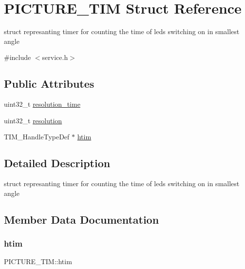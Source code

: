 \hypertarget{struct_p_i_c_t_u_r_e___t_i_m}{}\section{P\+I\+C\+T\+U\+R\+E\+\_\+\+T\+IM Struct Reference}
\label{struct_p_i_c_t_u_r_e___t_i_m}


struct represanting timer for counting the time of leds switching on in smallest angle  




{\ttfamily \#include $<$service.\+h$>$}

\subsection*{Public Attributes}
\begin{DoxyCompactItemize}
\item 
uint32\+\_\+t \mbox{\hyperlink{struct_p_i_c_t_u_r_e___t_i_m_ae44652306b65f37915c24a4c344733b5}{resolution\+\_\+time}}
\item 
uint32\+\_\+t \mbox{\hyperlink{struct_p_i_c_t_u_r_e___t_i_m_a3d06b455814460a24c468ebcd99d3816}{resolution}}
\item 
T\+I\+M\+\_\+\+Handle\+Type\+Def $\ast$ \mbox{\hyperlink{struct_p_i_c_t_u_r_e___t_i_m_ae83c4bfd7070876e22da472393b7a7a8}{htim}}
\end{DoxyCompactItemize}


\subsection{Detailed Description}
struct represanting timer for counting the time of leds switching on in smallest angle 

\subsection{Member Data Documentation}
\mbox{\label{struct_p_i_c_t_u_r_e___t_i_m_ae83c4bfd7070876e22da472393b7a7a8}} 
\subsubsection{\texorpdfstring{htim}{htim}}
{\footnotesize\ttfamily P\+I\+C\+T\+U\+R\+E\+\_\+\+T\+I\+M\+::htim}

